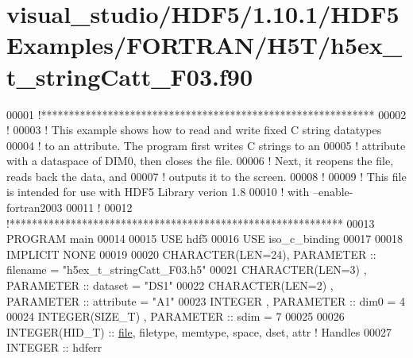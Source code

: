 \hypertarget{visual__studio_2_h_d_f5_21_810_81_2_h_d_f5_examples_2_f_o_r_t_r_a_n_2_h5_t_2h5ex__t__string_catt___f03_8f90_source}{}\section{visual\+\_\+studio/\+H\+D\+F5/1.10.1/\+H\+D\+F5\+Examples/\+F\+O\+R\+T\+R\+A\+N/\+H5\+T/h5ex\+\_\+t\+\_\+string\+Catt\+\_\+\+F03.f90}
\label{visual__studio_2_h_d_f5_21_810_81_2_h_d_f5_examples_2_f_o_r_t_r_a_n_2_h5_t_2h5ex__t__string_catt___f03_8f90_source}

\begin{DoxyCode}
00001 \textcolor{comment}{!************************************************************}
00002 \textcolor{comment}{!}
00003 \textcolor{comment}{!  This example shows how to read and write fixed C string datatypes}
00004 \textcolor{comment}{!  to an attribute.  The program first writes C strings to an}
00005 \textcolor{comment}{!  attribute with a dataspace of DIM0, then closes the file.}
00006 \textcolor{comment}{!  Next, it reopens the file, reads back the data, and}
00007 \textcolor{comment}{!  outputs it to the screen.}
00008 \textcolor{comment}{!}
00009 \textcolor{comment}{!  This file is intended for use with HDF5 Library verion 1.8}
00010 \textcolor{comment}{!  with --enable-fortran2003 }
00011 \textcolor{comment}{!}
00012 \textcolor{comment}{!************************************************************}
00013 \textcolor{keyword}{PROGRAM} main
00014 
00015   \textcolor{keywordtype}{USE }hdf5
00016   \textcolor{keywordtype}{USE }iso\_c\_binding
00017 
00018   \textcolor{keywordtype}{IMPLICIT NONE}
00019 
00020   \textcolor{keywordtype}{CHARACTER(LEN=24)}, \textcolor{keywordtype}{PARAMETER} :: filename  = \textcolor{stringliteral}{"h5ex\_t\_stringCatt\_F03.h5"}
00021   \textcolor{keywordtype}{CHARACTER(LEN=3)} , \textcolor{keywordtype}{PARAMETER} :: dataset   = \textcolor{stringliteral}{"DS1"}
00022   \textcolor{keywordtype}{CHARACTER(LEN=2)} , \textcolor{keywordtype}{PARAMETER} :: attribute = \textcolor{stringliteral}{"A1"}
00023   \textcolor{keywordtype}{INTEGER}          , \textcolor{keywordtype}{PARAMETER} :: dim0      = 4
00024   \textcolor{keywordtype}{INTEGER(SIZE\_T)}  , \textcolor{keywordtype}{PARAMETER} :: sdim      = 7
00025 
00026   \textcolor{keywordtype}{INTEGER(HID\_T)}  :: \hyperlink{structfile}{file}, filetype, memtype, space, dset, attr \textcolor{comment}{! Handles}
00027   \textcolor{keywordtype}{INTEGER} :: hdferr

\end{DoxyCode}
